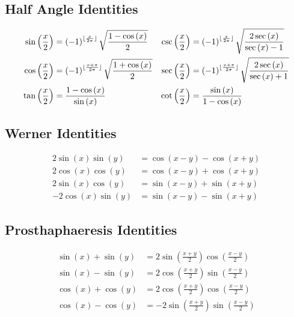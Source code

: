 \documentclass{article}
\begin{document}
\subsection{Half Angle Identities}
\begin{align*}
	\sin{\left( \frac{x}{2} \right)} &= \left( -1 \right)^{\lfloor\frac{x}{2\pi}\rfloor}\sqrt{\frac{1-\cos{\left( x \right)}}{2}}     & \csc{\left( \frac{x}{2} \right)} &= \left( -1 \right)^{\lfloor\frac{x}{2\pi}\rfloor} \sqrt{\frac{2\sec{\left( x \right)}}{\sec{\left( x \right)}-1}} \\
	\cos{\left( \frac{x}{2} \right)} &= \left( -1 \right)^{\lfloor\frac{x+\pi}{2\pi}\rfloor}\sqrt{\frac{1+\cos{\left( x \right)}}{2}} & \sec{\left( \frac{x}{2} \right)} &= \left( -1 \right)^{\lfloor\frac{x+\pi}{2\pi}\rfloor} \sqrt{\frac{2\sec{\left( x \right)}}{\sec{\left( x \right)}+1}} \\
	\tan{\left( \frac{x}{2} \right)} &= \frac{1-\cos{\left( x \right)}}{\sin{\left( x \right)}}                                 & \cot{\left( \frac{x}{2} \right)} &= \frac{\sin{\left( x \right)}}{1-\cos{\left( x \right)}} 
\end{align*}
\subsection{Werner Identities}
\begin{align*}
	 2\sin{\left( x \right)}\sin{\left( y \right)} &= \cos{\left( x-y \right)}-\cos{\left( x+y \right)} \\
	 2\cos{\left( x \right)}\cos{\left( y \right)} &= \cos{\left( x-y \right)}+\cos{\left( x+y \right)} \\
	 2\sin{\left( x \right)}\cos{\left( y \right)} &= \sin{\left( x-y \right)}+\sin{\left( x+y \right)} \\
    -2\cos{\left( x \right)}\sin{\left( y \right)} &= \sin{\left( x-y \right)}-\sin{\left( x+y \right)}
\end{align*}
\subsection{Prosthaphaeresis Identities}
\begin{align*}
	\sin{\left( x \right)}+\sin{\left( y \right)} &= 2\sin{\left(\frac{x+y}{2} \right)}\cos{\left( \frac{x-y}{2} \right)} \\
	\sin{\left( x \right)}-\sin{\left( y \right)} &= 2\cos{\left(\frac{x+y}{2} \right)}\sin{\left( \frac{x-y}{2} \right)} \\
	\cos{\left( x \right)}+\cos{\left( y \right)} &= 2\cos{\left(\frac{x+y}{2} \right)}\cos{\left( \frac{x-y}{2} \right)} \\
	\cos{\left( x \right)}-\cos{\left( y \right)} &= -2\sin{\left(\frac{x+y}{2} \right)}\sin{\left( \frac{x-y}{2} \right)} \\
\end{align*}
\end{document}
